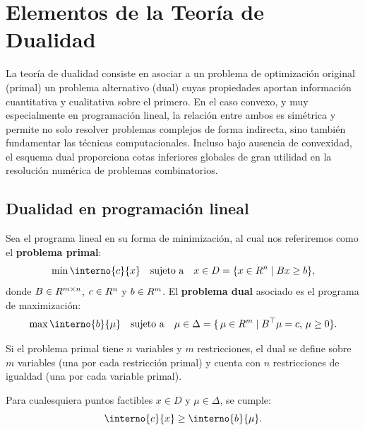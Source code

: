 
\chapter{Elementos de la Teoría de Dualidad}
\label{v1:chap:5}

La teoría de dualidad consiste en asociar a un problema de optimización original (primal) un problema alternativo (dual) cuyas propiedades aportan información cuantitativa y cualitativa sobre el primero. En el caso convexo, y muy especialmente en programación lineal, la relación entre ambos es simétrica y permite no solo resolver problemas complejos de forma indirecta, sino también fundamentar las técnicas computacionales. Incluso bajo ausencia de convexidad, el esquema dual proporciona cotas inferiores globales de gran utilidad en la resolución numérica de problemas combinatorios.

\section{Dualidad en programación lineal}\label{v1:sec:5.1}

Sea el programa lineal en su forma de minimización, al cual nos referiremos como el \textbf{problema primal}:
\begin{equation}
 \min \interno{c}{x} \quad \text{sujeto a} \quad x \in D = \{x \in \Rn \mid Bx \ge b\},
 \label{v1:eq:primal_lp}
\end{equation}
donde $B \in R^{m \times n}$, $c \in R^n$ y $b \in R^m$. El \textbf{problema dual} asociado es el programa de maximización:
\begin{equation}
 \max \interno{b}{\mu} \quad \text{sujeto a} \quad \mu \in \Delta = \{\, \mu \in \R^m \mid B^\top \mu = c, \, \mu \ge 0\}.
 \label{v1:eq:dual_lp}
\end{equation}

Si el problema primal tiene $n$ variables y $m$ restricciones, el dual se define sobre $m$ variables (una por cada restricción primal) y cuenta con $n$ restricciones de igualdad (una por cada variable primal).

\begin{proposition}\label{v1:prop:dualidad_debil}
 Para cualesquiera puntos factibles $x \in D$ y $\mu \in \Delta$, se cumple:
 \begin{equation}
 \interno{c}{x} \ge \interno{b}{\mu}.
 \label{v1:eq:dualidad_debil}
 \end{equation}
\end{proposition}

